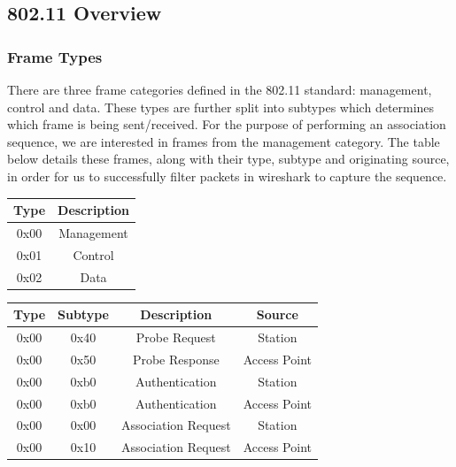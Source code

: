 \subsection{802.11 Overview}
\subsubsection{Frame Types}
There are three frame categories defined in the 802.11 standard: management, control and data. These types are further split into subtypes which determines which frame is being sent/received. For the purpose of performing an association sequence, we are interested in frames from the management category. The table below details these frames, along with their type, subtype and originating source, in order for us to successfully filter packets in wireshark to capture the sequence.

\begin{table}[h!]
\begin{center}
	\begin{tabular}{| c | c |}
		\hline
		\textbf{Type} & \textbf{Description} \\ \hline
		0x00 & Management \\ \hline
		0x01 & Control \\ \hline
		0x02 & Data \\ \hline
	\end{tabular}
	
\end{center}
\end{table}
\begin{table}[h!]
\begin{center}
	\begin{tabular}{| c | c | c | c |}
		\hline
		\textbf{Type} & \textbf{Subtype} &  \textbf{Description} &  \textbf{Source} \\ \hline
		0x00 & 0x40 & Probe Request & Station \\ \hline
		0x00 & 0x50 & Probe Response & Access Point \\ \hline
		0x00 & 0xb0 & Authentication & Station \\ \hline
		0x00 & 0xb0 & Authentication & Access Point \\ \hline
		0x00 & 0x00 & Association Request & Station \\ \hline
		0x00 & 0x10 & Association Request & Access Point \\ \hline
	\end{tabular}
\end{center}
\end{table}

